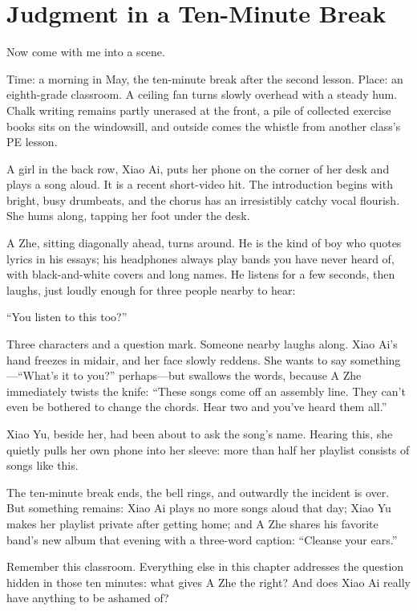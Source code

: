 \section{Judgment in a Ten-Minute Break}
Now come with me into a scene.

Time: a morning in May, the ten-minute break after the second lesson. Place: an eighth-grade classroom. A ceiling fan turns slowly overhead with a steady hum. Chalk writing remains partly unerased at the front, a pile of collected exercise books sits on the windowsill, and outside comes the whistle from another class's PE lesson.

A girl in the back row, Xiao Ai, puts her phone on the corner of her desk and plays a song aloud. It is a recent short-video hit. The introduction begins with bright, busy drumbeats, and the chorus has an irresistibly catchy vocal flourish. She hums along, tapping her foot under the desk.

A Zhe, sitting diagonally ahead, turns around. He is the kind of boy who quotes lyrics in his essays; his headphones always play bands you have never heard of, with black-and-white covers and long names. He listens for a few seconds, then laughs, just loudly enough for three people nearby to hear:

``You listen to this too?''

Three characters and a question mark. Someone nearby laughs along. Xiao Ai's hand freezes in midair, and her face slowly reddens. She wants to say something---``What's it to you?'' perhaps---but swallows the words, because A Zhe immediately twists the knife: ``These songs come off an assembly line. They can't even be bothered to change the chords. Hear two and you've heard them all.''

Xiao Yu, beside her, had been about to ask the song's name. Hearing this, she quietly pulls her own phone into her sleeve: more than half her playlist consists of songs like this.

The ten-minute break ends, the bell rings, and outwardly the incident is over. But something remains: Xiao Ai plays no more songs aloud that day; Xiao Yu makes her playlist private after getting home; and A Zhe shares his favorite band's new album that evening with a three-word caption: ``Cleanse your ears.''

Remember this classroom. Everything else in this chapter addresses the question hidden in those ten minutes: what gives A Zhe the right? And does Xiao Ai really have anything to be ashamed of?

